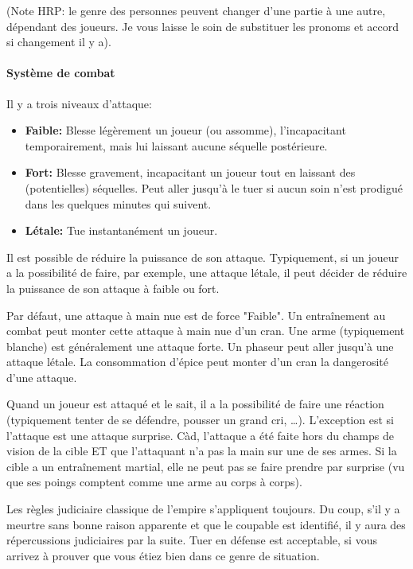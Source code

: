 {	\par (Note HRP: le genre des personnes peuvent changer d'une partie à une autre, dépendant des joueurs. Je vous laisse le soin de substituer les pronoms et accord si changement il y a).
	
	\paragraph{Système de combat} Il y a trois niveaux d'attaque:
	\begin{itemize}
		\item \textbf{Faible:} Blesse légèrement un joueur (ou assomme), l'incapacitant temporairement, mais lui laissant aucune séquelle postérieure.
		\item \textbf{Fort:} Blesse gravement, incapacitant un joueur tout en laissant des (potentielles) séquelles. Peut aller jusqu'à le tuer si aucun soin n'est prodigué dans les quelques minutes qui suivent.
		\item \textbf{Létale:} Tue instantanément un joueur.
	\end{itemize}
	\par Il est possible de réduire la puissance de son attaque. Typiquement, si un joueur a la possibilité de faire, par exemple, une attaque létale, il peut décider de réduire la puissance de son attaque à faible ou fort.
	
	\par Par défaut, une attaque à main nue est de force "Faible". Un entraînement au combat peut monter cette attaque à main nue d'un cran. Une arme (typiquement blanche) est généralement une attaque forte. Un phaseur peut aller jusqu'à une attaque létale. La consommation d'épice peut monter d'un cran la dangerosité d'une attaque.
	
	\par Quand un joueur est attaqué et le sait, il a la possibilité de faire une réaction (typiquement tenter de se défendre, pousser un grand cri, \dots). L'exception est si l'attaque est une attaque surprise. Càd, l'attaque a été faite hors du champs de vision de la cible ET que l'attaquant n'a pas la main sur une de ses armes. Si la cible a un entraînement martial, elle ne peut pas se faire prendre par surprise (vu que ses poings comptent comme une arme au corps à corps).
	
	\par Les règles judiciaire classique de l'empire s'appliquent toujours. Du coup, s'il y a meurtre sans bonne raison apparente et que le coupable est identifié, il y aura des répercussions judiciaires par la suite. Tuer en défense est acceptable, si vous arrivez à prouver que vous étiez bien dans ce genre de situation.
	
}
